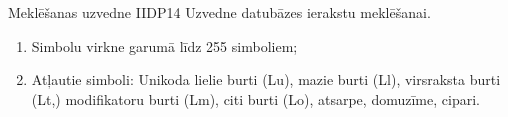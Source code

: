 {Meklēšanas uzvedne}
{IIDP14}
{
	Uzvedne datubāzes ierakstu meklēšanai.
}
{
	\begin{enumerate}
		\item Simbolu virkne garumā līdz 255 simboliem;
		\item Atļautie simboli: Unikoda lielie burti (Lu), mazie burti (Ll), virsraksta burti (Lt,) modifikatoru burti (Lm), citi burti (Lo), atsarpe, domuzīme, cipari.
	\end{enumerate}
}
{
}
